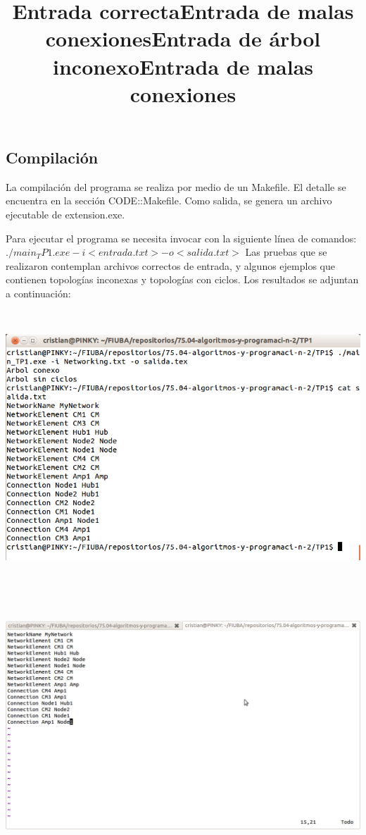 \documentclass[10pt,a4paper]{article}
\begin{document}
\subsection{Compilación}
La compilación del programa se realiza por medio de un Makefile. El detalle se encuentra en la sección CODE::Makefile. Como salida, se genera un archivo ejecutable de extension.exe.

Para ejecutar el programa se necesita invocar con la siguiente línea de comandos:
\texttt{$./main_TP1.exe -i <entrada.txt> -o <salida.txt>$}
Las pruebas que se realizaron contemplan archivos correctos de entrada, y algunos ejemplos que contienen topologías inconexas y topologías con ciclos. Los resultados se adjuntan a continuación:\\
\title{Entrada correcta}\\
\begin{center}
\includegraphics[scale=0.25]{Images/test1.png}\\
\end{center}\title{Entrada de malas conexiones}\\
\title{Entrada de árbol inconexo}\\
\begin{center}
\includegraphics[scale=0.25]{Images/entrada de arbol inconexo.png}\\
\end{center}\title{Entrada de malas conexiones}\\
\end{document}
